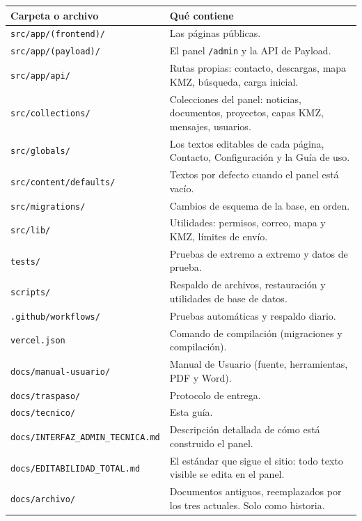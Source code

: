 \documentclass[11pt,letterpaper]{article}
\newcommand{\ruta}[1]{\nolinkurl{#1}}
\newcommand{\cab}[1]{\textbf{\color{h2vgris}#1}}
\begin{document}
\begin{tabularx}{\textwidth}{@{}P{5.2cm}Y@{}}
\toprule
\cab{Carpeta o archivo} & \cab{Qué contiene}\\
\midrule
\ruta{src/app/(frontend)/} & Las páginas públicas.\\
\ruta{src/app/(payload)/} & El panel \ruta{/admin} y la API de Payload.\\
\ruta{src/app/api/} & Rutas propias: contacto, descargas, mapa KMZ, búsqueda, carga inicial.\\
\ruta{src/collections/} & Colecciones del panel: noticias, documentos, proyectos, capas KMZ, mensajes, usuarios.\\
\ruta{src/globals/} & Los textos editables de cada página, Contacto, Configuración y la Guía de uso.\\
\ruta{src/content/defaults/} & Textos por defecto cuando el panel está vacío.\\
\ruta{src/migrations/} & Cambios de esquema de la base, en orden.\\
\ruta{src/lib/} & Utilidades: permisos, correo, mapa y KMZ, límites de envío.\\
\ruta{tests/} & Pruebas de extremo a extremo y datos de prueba.\\
\ruta{scripts/} & Respaldo de archivos, restauración y utilidades de base de datos.\\
\ruta{.github/workflows/} & Pruebas automáticas y respaldo diario.\\
\ruta{vercel.json} & Comando de compilación (migraciones y compilación).\\
\ruta{docs/manual-usuario/} & Manual de Usuario (fuente, herramientas, PDF y Word).\\
\ruta{docs/traspaso/} & Protocolo de entrega.\\
\ruta{docs/tecnico/} & Esta guía.\\
\ruta{docs/INTERFAZ_ADMIN_TECNICA.md} & Descripción detallada de cómo está construido el panel.\\
\ruta{docs/EDITABILIDAD_TOTAL.md} & El estándar que sigue el sitio: todo texto visible se edita en el panel.\\
\ruta{docs/archivo/} & Documentos antiguos, reemplazados por los tres actuales. Solo como historia.\\
\bottomrule
\end{tabularx}
\end{document}

